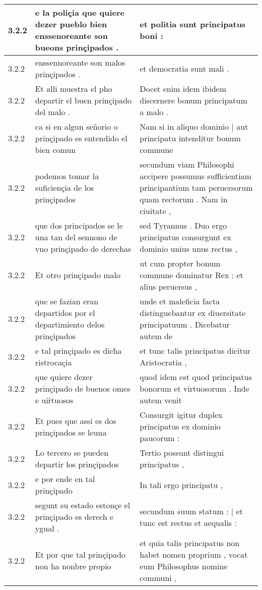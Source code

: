 \begin{tabular}{|p{1cm}|p{6.5cm}|p{6.5cm}|}
3.2.2 & e la poliçia que quiere dezer pueblo bien enssenoreante son bueons prinçipados . & et politia sunt principatus boni : \\\hline
3.2.2 & enssennoreante son malos prinçipados . & et democratia sunt mali . \\\hline
3.2.2 & Et alli muestra el pho departir el buen prinçipado del malo . & Docet enim idem ibidem discernere bonum principatum a malo . \\\hline
3.2.2 & ca si en algun señorio o prinçipado es entendido el bien comun & Nam si in aliquo dominio | aut principatu intenditur bonum commune \\\hline
3.2.2 & podemos tomar la suficiençia de los prinçipados & secundum viam Philosophi accipere possumus sufficientiam principantium tam peruersorum quam rectorum . Nam in ciuitate , \\\hline
3.2.2 & que dos principados se le una tan del sennono de vno prinçipado de derechas & sed Tyrannus . Duo ergo principatus consurgunt ex dominio unius unus rectus , \\\hline
3.2.2 & Et otro prinçipado malo & ut cum propter bonum commune dominatur Rex : et alius peruersus , \\\hline
3.2.2 & que se fazian eran departidos por el departimiento delos prinçipados & unde et maleficia facta distinguebantur ex diuersitate principatuum . Dicebatur autem de \\\hline
3.2.2 & e tal prinçipado es dicħa ristrocaçia & et tunc talis principatus dicitur Aristocratia , \\\hline
3.2.2 & que quiere dezer prinçipado de buenos omes e uir̉tuosos & quod idem est quod principatus bonorum et virtuosorum . Inde autem venit \\\hline
3.2.2 & Et pues que assi es dos prinçipados se leuna & Consurgit igitur duplex principatus ex dominio paucorum : \\\hline
3.2.2 & Lo tercero se pueden departir los prinçipados & Tertio possunt distingui principatus , \\\hline
3.2.2 & e por ende en tal prinçipado & In tali ergo principatu , \\\hline
3.2.2 & segunt su estado estonçe el prinçipado es derech e ygual . & secundum suum statum : | et tunc est rectus et aequalis : \\\hline
3.2.2 & Et por que tal prinçipado non ha nonbre propio & et quia talis principatus non habet nomen proprium , vocat eum Philosophus nomine communi , \\\hline

\end{tabular}
